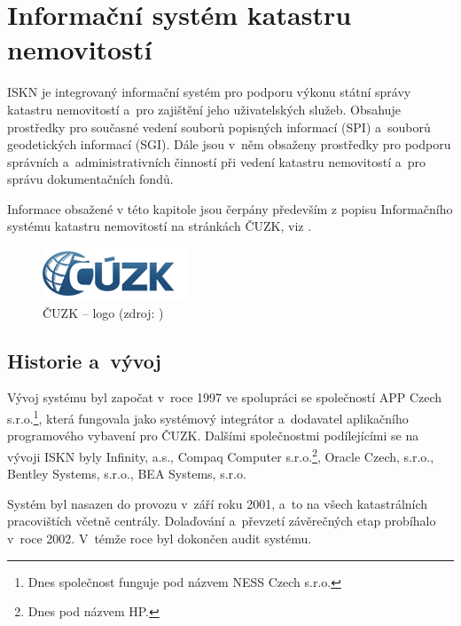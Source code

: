 \documentclass[a4paper,12pt,oneside]{book}
\begin{document}
\clearpage
\chapter{Informační systém katastru nemovitostí}
\label{l_iskn}

ISKN je integrovaný informační systém pro podporu výkonu státní správy
katastru nemovitostí a~pro zajištění jeho uživatelských
služeb. Obsahuje prostředky pro současné vedení souborů popisných
informací (SPI) a~souborů geodetických informací (SGI). Dále jsou
v~něm obsaženy prostředky pro podporu správních a~administrativních
činností při vedení katastru nemovitostí a~pro správu dokumentačních
fondů. 

Informace obsažené v této kapitole jsou čerpány především z popisu Informačního
systému katastru nemovitostí na stránkách ČUZK, viz \cite{iskn}.

\begin{figure}[htb]
\centering
\includegraphics[scale=1]{images/cuzk-logo.png}
\caption[ČUZK -- logo]{ČUZK -- logo (zdroj: \cite{iskn})}
\end{figure}

\section{Historie a~vývoj}

Vývoj systému byl započat v~roce 1997 ve spolupráci se společností APP
Czech s.r.o.\footnote{Dnes společnost funguje pod názvem NESS Czech
  s.r.o.}, která fungovala jako systémový integrátor a~dodavatel
aplikačního programového vybavení pro ČUZK. Dalšími společnostmi podílejícími
se na vývoji ISKN byly Infinity, a.s., Compaq Computer
s.r.o.\footnote{Dnes pod názvem HP.}, Oracle Czech, s.r.o., Bentley
Systems, s.r.o., BEA Systems, s.r.o.

Systém byl nasazen do provozu v~září roku 2001, a~to na všech
katastrálních pracovištích včetně centrály. Dolaďování a~převzetí
závěrečných etap probíhalo v~roce 2002. V~témže roce byl dokončen
audit systému.
\end{document}
